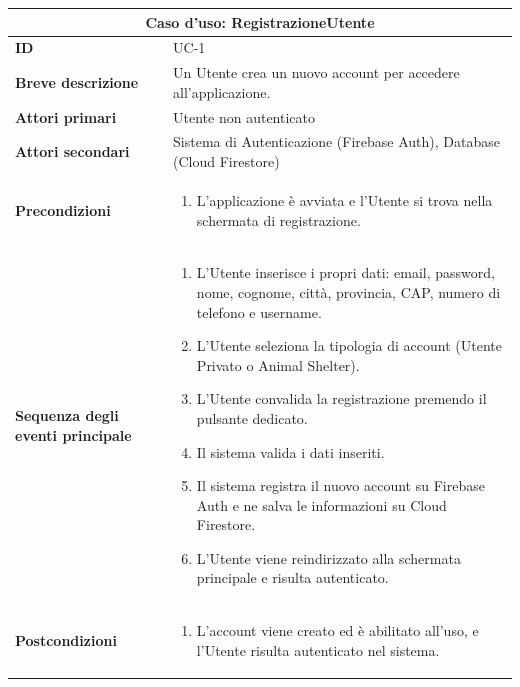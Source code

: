 \documentclass[a4paper]{report}
\begin{document}
\begin{table}[H]
\vspace*{-0cm}
\renewcommand{\arraystretch}{1.9}
\begin{tabular}{|p{3.9cm}|p{9.9cm}|}
\hline
\multicolumn{2}{|c|}{\textbf{Caso d’uso: RegistrazioneUtente}} \\ \hline
\textbf{ID} & UC-1 \\ \hline
\textbf{Breve descrizione} & Un Utente crea un nuovo account per accedere all'applicazione. \\ \hline
\textbf{Attori primari} & Utente non autenticato \\ \hline
\textbf{Attori secondari} & Sistema di Autenticazione (Firebase Auth), Database (Cloud Firestore) \\ \hline
\textbf{Precondizioni} & \begin{enumerate}[leftmargin=14pt,label=\arabic*.,labelsep=0.5em,topsep=0pt,partopsep=0pt,parsep=0pt,itemsep=0pt]
    \item L'applicazione è avviata e l'Utente si trova nella schermata di registrazione.
\end{enumerate} \\ \hline
\textbf{Sequenza degli eventi principale} &
\begin{enumerate}[leftmargin=14pt,label=\arabic*.,labelsep=0.5em,topsep=0pt,partopsep=0pt,parsep=0pt,itemsep=0pt]
   \item L'Utente inserisce i propri dati: email, password, nome, cognome, città, provincia, CAP, numero di telefono e username.
   \item L'Utente seleziona la tipologia di account (Utente Privato o Animal Shelter).
   \item L'Utente convalida la registrazione premendo il pulsante dedicato.
   \item Il sistema valida i dati inseriti.
   \item Il sistema registra il nuovo account su Firebase Auth e ne salva le informazioni su Cloud Firestore.
   \item L'Utente viene reindirizzato alla schermata principale e risulta autenticato.
\end{enumerate}\\ \hline
\textbf{Postcondizioni} &
\begin{enumerate}[leftmargin=14pt,label=\arabic*.,labelsep=0.5em,topsep=0pt,partopsep=0pt,parsep=0pt,itemsep=0pt]
\item L'account viene creato ed è abilitato all'uso, e l'Utente risulta autenticato nel sistema.

\end{enumerate}
\end{tabular}
\end{table}
\end{document}
